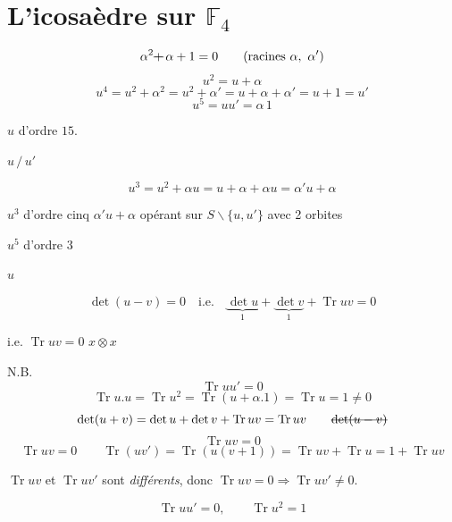 \documentclass[11pt,a4paper]{article}
\begin{document}
\section{L'icosaèdre sur $\mathbb{F}_4$}



\[
\alpha^2 \text{\struck{$+$}}\, \alpha + 1 = 0 \qquad (\text{racines } \alpha,\ \alpha')
\]
\[
u^2 = u + \alpha
\]
\[
u^4 = u^2 + \alpha^2 = u^2 + \alpha' = u + \alpha + \alpha' = u + 1 = u'
\]
\[
u^5 = u u' = \alpha\, 1
\]

$u$ d'ordre $15$.

\struck{\ill{}} \quad $u \,/\, u'$

\[
u^3 = u^2 + \alpha u = u + \alpha + \alpha u = \alpha' u + \alpha
\]

$u^3$ d'ordre cinq \quad $\boxed{\alpha' u + \alpha}$ \struck{\ill{}} \quad opérant  sur $S \smallsetminus \{u, u'\}$ avec 2 orbites

$u^5$ d'ordre 3

\struck{\ill{}} \quad {} $u$

\[
\det(u-v) = 0 \quad \text{i.e.} \quad
\underbrace{\det u}_{1} + \underbrace{\det v}_{1} + \operatorname{Tr} u v = 0
\]

i.e. $\operatorname{Tr} u v = 0$ \qquad $x \otimes x$

N.B.
\[
\operatorname{Tr} u u' = 0
\]
\[
\operatorname{Tr} u.u = \operatorname{Tr} u^2 = \operatorname{Tr}(u + \alpha.1)
= \operatorname{Tr} u = 1 \neq 0
\]
\[
\det(u+v) = \det u + \det v + \operatorname{Tr} u v = \operatorname{Tr} u v
\qquad \text{\struck{$\det(u-v)$}}
\]
\[
\operatorname{Tr} u v = 0
\]
\[
\operatorname{Tr} u v = 0 \qquad
\operatorname{Tr}(u v') = \operatorname{Tr}(u(v+1))
= \operatorname{Tr} u v + \operatorname{Tr} u = 1 + \operatorname{Tr} u v
\]

$\operatorname{Tr} u v$ et $\operatorname{Tr} u v'$ sont \emph{différents}, donc
$\operatorname{Tr} u v = 0 \Rightarrow \operatorname{Tr} u v' \neq 0$.

\[
\operatorname{Tr} u u' = 0, \qquad \operatorname{Tr} u^2 = 1
\]

\end{document}
